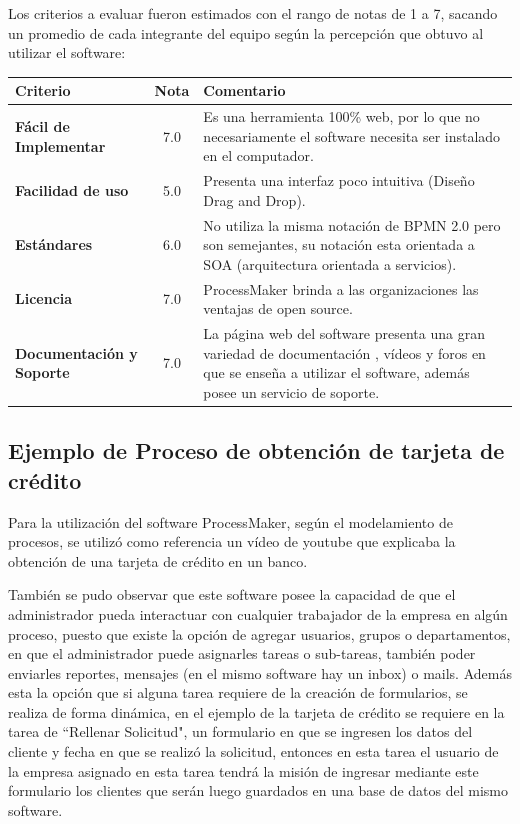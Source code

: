 Los criterios a evaluar fueron estimados con el rango de notas de 1 a 7, sacando un promedio de cada integrante del equipo según la percepción que obtuvo al utilizar el software: \\

\begin{center}
\begin{tabular}{|l|c|p{2.40in}|}
 \hline
 \textbf{Criterio} & \textbf{Nota} & \textbf{Comentario} \\
 \hline
 \textbf{Fácil de Implementar} & 7.0 & Es una herramienta 100\% web, por lo que no necesariamente el software necesita ser instalado en el computador. \\
 \hline
 \textbf{Facilidad de uso} & 5.0 & Presenta una interfaz poco intuitiva (Diseño Drag and Drop). \\
 \hline
 \textbf{Estándares} & 6.0 & No utiliza la misma notación de BPMN 2.0 pero son semejantes, su notación esta orientada a SOA (arquitectura orientada a servicios). \\
 \hline
 \textbf{Licencia} & 7.0 & ProcessMaker brinda a las organizaciones las ventajas de open source. \\
 \hline
 \textbf{Documentación y Soporte} & 7.0 & La página web del software presenta una gran variedad de documentación , vídeos y foros en que se enseña a utilizar el software, además posee un servicio de soporte. \\
 \hline
\end{tabular}
\end{center}

\subsection{Ejemplo de Proceso de obtención de tarjeta de crédito}
Para la utilización del software ProcessMaker, según el modelamiento de procesos, se utilizó como referencia un vídeo de youtube que explicaba la obtención de una tarjeta de crédito en un banco.

También se pudo observar que este software posee la capacidad de que el administrador pueda interactuar con cualquier trabajador de la empresa en algún proceso, puesto que existe la opción de agregar usuarios, grupos o departamentos, en que el administrador puede asignarles tareas o sub-tareas, también poder enviarles reportes, mensajes (en el mismo software hay un inbox) o mails. Además esta la opción que si alguna tarea requiere de la creación de formularios, se realiza de forma dinámica, en el ejemplo de la tarjeta de crédito se requiere en la tarea de ``Rellenar Solicitud", un formulario en que se ingresen los datos del cliente y fecha en que se realizó la solicitud, entonces en esta tarea el usuario de la empresa asignado en esta tarea tendrá la misión de ingresar mediante este formulario los clientes que serán luego guardados en una base de datos del mismo software.
 
